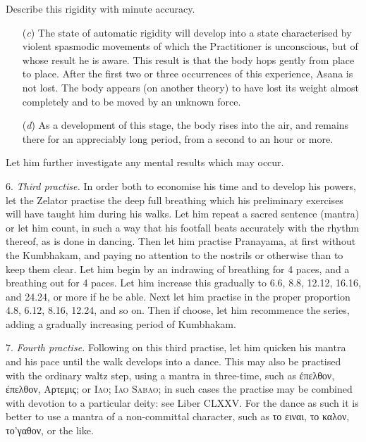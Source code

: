 Describe this rigidity with minute accuracy.

\begin{enumerate}
\item[(\textit{c})] The state of automatic rigidity will develop into a state characterised by violent spasmodic movements of which the Practitioner is unconscious, but of whose result he is aware. This result is that the body hops gently from place to place. After the first two or three occurrences of this experience, Asana is not lost. The body appears (on another theory) to have lost its weight almost completely and to be moved by an unknown force.
\item[(\textit{d})] As a development of this stage, the body rises into the air, and remains there for an appreciably long period, from a second to an hour or more.
\end{enumerate}
Let him further investigate any mental results which may occur.

6. \textit{Third practise.} In order both to economise his time and to develop his powers, let the Zelator practise the deep full breathing which his preliminary exercises will have taught him during his walks. Let him repeat a sacred sentence (mantra) or let him count, in such a way that his footfall beats accurately with the rhythm thereof, as is done in dancing. Then let him practise Pranayama, at first without the Kumbhakam, and paying no attention to the nostrils or otherwise than to keep them clear. Let him begin by an indrawing of breathing for 4 paces, and a breathing out for 4 paces. Let him increase this gradually to 6.6, 8.8, 12.12, 16.16, and 24.24, or more if he be able. Next let him practise in the proper proportion 4.8, 6.12, 8.16, 12.24, and so on. Then if choose, let him recommence the series, adding a gradually increasing period of Kumbhakam.

7. \textit{Fourth practise.} Following on this third practise, let him quicken his mantra and his pace until the walk develops into a dance. This may also be practised with the ordinary waltz step, using a mantra in three-time, such as \'{ε}πελθον, \'{ε}πελθον, Αρτεμις; or \textsc{Iao; Iao Sabao}; in such cases the practise may be combined with devotion to a particular deity: see Liber CLXXV. For the dance as such it is better to use a mantra of a non-committal character, such as το ειναι, το καλον, το’γαθον, or the like.

